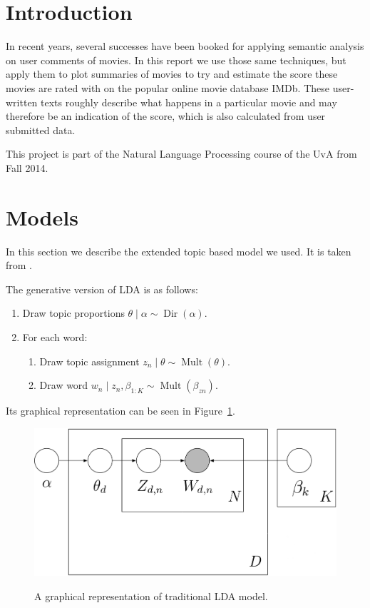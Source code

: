 \documentclass[a4paper,10pt]{article}
\title{}
\author{}
\DeclareMathOperator{\Dir}{Dir}
\DeclareMathOperator{\Mult}{Mult}
\begin{document}
\section{Introduction} %

In recent years, several successes have been booked for applying semantic analysis on user comments of movies.
In this report we use those same techniques, but apply them to plot summaries of movies to try and estimate the score these movies are rated with on the popular online movie database IMDb.
These user-written texts roughly describe what happens in a particular movie and may therefore be an indication of the score, which is also calculated from user submitted data.

This project is part of the Natural Language Processing course of the UvA from Fall 2014.

\section{Models}
In this section we describe the extended topic based model we used.
It is taken from \cite{dfsdf}.

The generative version of LDA is as follows:
\begin{enumerate}
  \item Draw topic proportions $\theta \mid \alpha \sim \Dir(\alpha)$.
  \item For each word:
  \begin{enumerate}
    \item Draw topic assignment $z_n \mid \theta \sim \Mult(\theta)$.
    \item Draw word $w_n \mid z_n, \beta_{1:K} \sim \Mult(\beta_{zn})$.
  \end{enumerate}
\end{enumerate}
Its graphical representation can be seen in Figure~\ref{fig:LDA}.

\begin{figure}[ht!]
  \centering
  \includegraphics[width=\textwidth]{LDA.png}
  \label{fig:LDA}
  \caption{A graphical representation of traditional LDA model.}
\end{figure}
\end{document}
